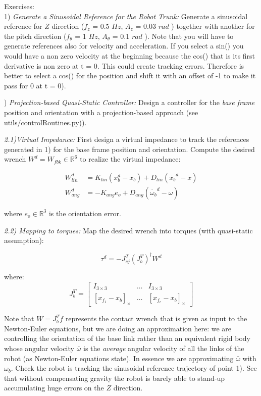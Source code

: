 \documentclass[11pt]{article}
\newcommand{\Rnum}{\mathbb{R}} %
\newcommand{\mat}[1]{\ensuremath{\begin{bmatrix}#1\end{bmatrix}}}	%
\begin{document}
\noindent Exercises:\\
1) \textit{Generate a Sinusoidal Reference for the Robot Trunk:} 
Generate a sinusoidal reference for $Z$ direction ($f_z$ = 0.5 $Hz$, $A_z$ = 0.03 $rad$ )
together with another for the pitch direction ($f_{\theta}$ = 1 $Hz$, $A_{\theta}$ = 0.1 $rad$ ). Note that you will have to generate references also for velocity and acceleration. If you select a sin() you would have a non zero velocity at the beginning because the cos() that is its first derivative is non zero at t = 0. This could create tracking errors. Therefore is better to select a cos() for the position and shift it with an offset of -1 to make it pass for 0 at t = 0). 

\quad
 
) \textit{Projection-based Quasi-Static Controller:} 
Design a controller for the \textit{base frame} position and orientation with a projection-based approach (see utils/controlRoutines.py)).

\quad

\noindent  
 \textit{2.1)Virtual Impedance:}
First design a virtual impedance to track the references generated in 1) for the base frame position and orientation. 
Compute the desired wrench $W^d = W_{fbk} \in\Rnum^6$ to realize the virtual impedance:

\begin{align}
W^d_{lin} & = K_{lin} (x^d_b - x_b ) + D_{lin} (\dot{x_b}^d - \dot{x})   \\
W^d_{ang} &=  - K_{ang} e_o + D_{ang} (\dot{\omega_b}^d - \omega)
\end{align}

where $e_o \in \Rnum^3$ is the orientation error. 

\quad

\noindent  
\textit{2.2) Mapping to torques:}
Map the desired wrench into torques (with quasi-static assumption):

\begin{equation}
\tau^d = -J_{cj}^T(J_b^T)^{\dagger} W^d
\end{equation}

where:
\begin{equation}
J_b^T = \mat{I_{3\times3} & \dots & I_{3\times3} \\
			[x_{f_1} - x_b]_{\times} & \dots & [x_{f_c} - x_b]_{\times}}
\label{eq:newton-euler}
\end{equation}


Note that $W = J_b^Tf$ represents the contact wrench that is given as input to the Newton-Euler equations, but we are doing an approximation here: we are controlling the orientation of the base link rather than an equivalent rigid body whose angular velocity $\bar{\omega}$ is the \textit{average} angular velocity of all the links of the robot (as Newton-Euler equations state). In essence we are approximating  $\bar{\omega}$ with ${\omega}_b$.
Check the robot is tracking the sinusoidal reference trajectory of point 1). 
See that without compensating gravity the robot is barely able to stand-up accumulating huge errors on the $Z$ direction.
\end{document}
